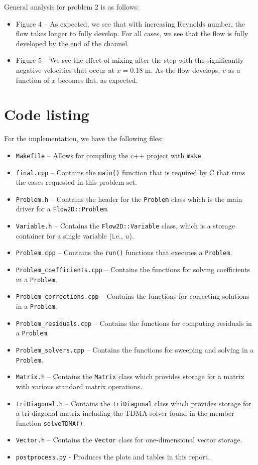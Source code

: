 \documentclass{article}
\begin{document}
General analysis for problem 2 is as follows:
\begin{itemize}
	\item Figure 4 -- As expected, we see that with increasing Reynolds number, the flow takes longer to fully develop. For all cases, we see that the flow is fully developed by the end of the channel.
	\item Figure 5 -- We see the effect of mixing after the step with the significantly negative velocities that occur at $x = 0.18$ m. As the flow develops, $v$ as a function of $x$ becomes flat, as expected.
\end{itemize}

\section*{Code listing}

For the implementation, we have the following files:
\begin{itemize}
	\item \texttt{Makefile} -- Allows for compiling the c++ project with \texttt{make}.
	\item \texttt{final.cpp} -- Contains the \texttt{main()} function that is required by C that runs the cases requested in this problem set.
	\item \texttt{Problem.h} -- Contains the header for the \texttt{Problem} class which is the main driver for a \texttt{Flow2D::Problem}.
	\item \texttt{Variable.h} -- Contains the \texttt{Flow2D::Variable} class, which is a storage container for a single variable (i.e., $u$).
	\item \texttt{Problem.cpp} -- Contains the \texttt{run()} functions that executes a \texttt{Problem}.
	\item \texttt{Problem\_coefficients.cpp} -- Contains the functions for solving coefficients in a \texttt{Problem}.
	\item \texttt{Problem\_corrections.cpp} -- Contains the functions for correcting solutions in a \texttt{Problem}.
	\item \texttt{Problem\_residuals.cpp} -- Contains the functions for computing residuals in a \texttt{Problem}.
	\item \texttt{Problem\_solvers.cpp} -- Contains the functions for sweeping and solving in a \texttt{Problem}.
	\item \texttt{Matrix.h} -- Contains the \texttt{Matrix} class which provides storage for a matrix with various standard matrix operations.
	\item \texttt{TriDiagonal.h} -- Contains the \texttt{TriDiagonal} class which provides storage for a tri-diagonal matrix including the TDMA solver found in the member function \texttt{solveTDMA()}.
	\item \texttt{Vector.h} -- Contains the \texttt{Vector} class for one-dimensional vector storage.
	\item \texttt{postprocess.py} - Produces the plots and tables in this report.
\end{itemize}
\end{document}
